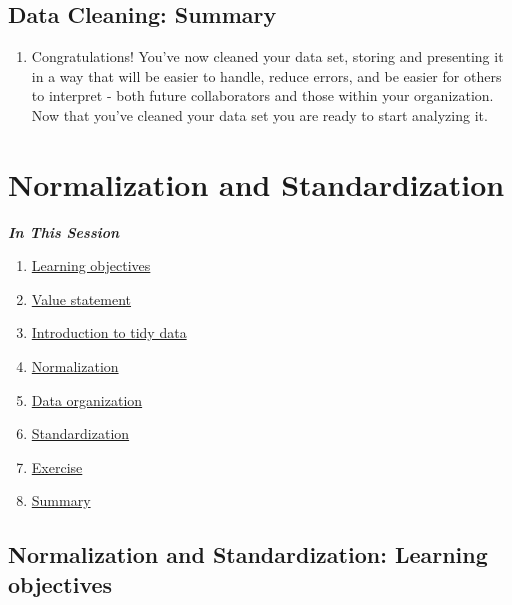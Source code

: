 \documentclass[
]{book}
\providecommand{\tightlist}{%
  \setlength{\itemsep}{0pt}\setlength{\parskip}{0pt}}
\begin{document}
\hypertarget{data-cleaning-summary}{%
\subsection{Data Cleaning: Summary}\label{data-cleaning-summary}}

\begin{enumerate}
\def\labelenumi{\arabic{enumi}.}
\tightlist
\item
  Congratulations! You've now cleaned your data set, storing and presenting it in a way that will be easier to handle, reduce errors, and be easier for others to interpret - both future collaborators and those within your organization. Now that you've cleaned your data set you are ready to start analyzing it.
\end{enumerate}

\hypertarget{normalization-and-standardization}{%
\section{Normalization and Standardization}\label{normalization-and-standardization}}

\textbf{\emph{In This Session}}

\begin{enumerate}
\def\labelenumi{\arabic{enumi}.}
\tightlist
\item
  \protect\hyperlink{normalization-and-standardization-learning-objectives}{Learning objectives}
\item
  \protect\hyperlink{normalization-and-standardization-value-statement}{Value statement}
\item
  \protect\hyperlink{introduction-to-tidy-data}{Introduction to tidy data}
\item
  \protect\hyperlink{normalization}{Normalization}
\item
  \protect\hyperlink{data-organization}{Data organization}
\item
  \protect\hyperlink{standardization}{Standardization}
\item
  \protect\hyperlink{exercise}{Exercise}
\item
  \protect\hyperlink{normalization-and-standardization-summary}{Summary}
\end{enumerate}

\hypertarget{normalization-and-standardization-learning-objectives}{%
\subsection{Normalization and Standardization: Learning objectives}\label{normalization-and-standardization-learning-objectives}}
\end{document}
